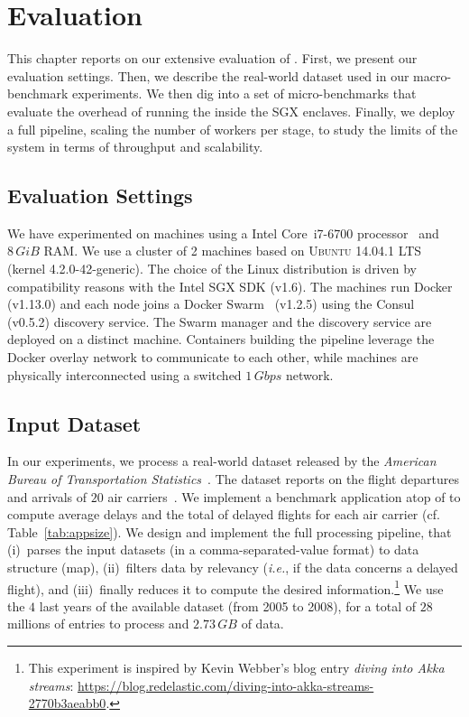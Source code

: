 
\chapter{Evaluation}
\label{chap:eval}

This chapter reports on our extensive evaluation of \SS{}.
First, we present our evaluation settings.
Then, we describe the real-world dataset used in our macro-benchmark experiments.
We then dig into a set of micro-benchmarks that evaluate the overhead of running the \luavm inside the SGX enclaves.
Finally, we deploy a full \SS{} pipeline, scaling the number of workers per stage, to study the limits of the system in terms of throughput and scalability.


\section{Evaluation Settings}

We have experimented on machines using a Intel{\textregistered} Core\texttrademark~i7-6700 processor~\cite{intel:i7_6700} and $8\,\mathit{GiB}$ RAM.
We use a cluster of 2 machines based on \textsc{Ubuntu} 14.04.1 LTS (kernel 4.2.0-42-generic).
The choice of the Linux distribution is driven by compatibility reasons with the Intel{\textregistered} SGX SDK (v1.6).
The machines run Docker (v1.13.0) and each node joins a Docker Swarm~\cite{docker:swarm_2016} (v1.2.5) using the Consul~\cite{consul} (v0.5.2) discovery service.
The Swarm manager and the discovery service are deployed on a distinct machine.
Containers building the pipeline leverage the Docker overlay network to communicate to each other, while machines are physically interconnected using a switched $1\,\mathit{Gbps}$ network.


\section{Input Dataset}

In our experiments, we process a real-world dataset released by the \emph{American Bureau of Transportation Statistics}~\cite{rita:bts}.
The dataset reports on the flight departures and arrivals of $20$ air carriers~\cite{statistical_computing:data}.
We implement a benchmark application atop of \SS{} to compute average delays and the total of delayed flights for each air carrier (cf. Table~\ref{tab:appsize}).
We design and implement the full processing pipeline, that (i)~parses the input datasets (in a comma-separated-value format) to data structure (\textsf{map}), (ii)~filters data by relevancy (\emph{i.e.}, if the data concerns a delayed flight), and (iii)~finally reduces it to compute the desired information.\footnote{This experiment is inspired by Kevin Webber's blog entry \emph{diving into Akka streams}: \url{https://blog.redelastic.com/diving-into-akka-streams-2770b3aeabb0}.}
We use the $4$ last years of the available dataset (from 2005 to 2008), for a total of $28$ millions of entries to process and $2.73\,\mathit{GB}$ of data.


